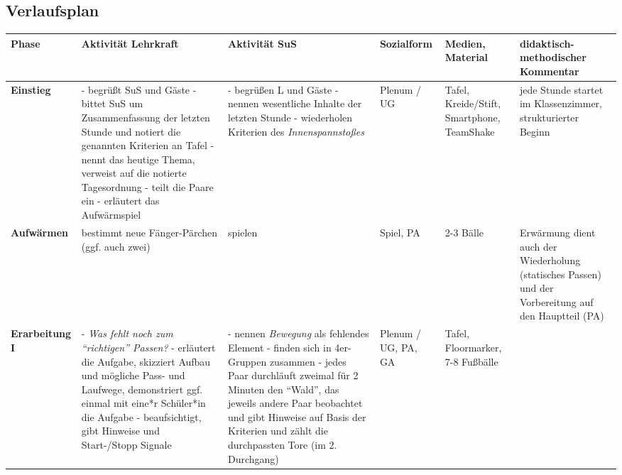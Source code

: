 

\begin{landscape}
\section{Verlaufsplan}

\singlespacing
\scriptsize
\begin{longtable}{p{2cm}|p{5.5cm}|p{5.5cm}|p{2cm}|p{2cm}|p{4cm}}

\textbf{Phase} &
\textbf{Aktivität Lehrkraft} &
\textbf{Aktivität SuS} &
\textbf{Sozialform} &
\textbf{Medien, Material} &
\textbf{didaktisch-methodischer Kommentar}
\\
\hline
\textbf{Einstieg}
&
- begrüßt SuS und Gäste \newline
- bittet SuS um Zusammenfassung der letzten Stunde und notiert die genannten Kriterien an Tafel \newline
- nennt das heutige Thema, verweist auf die notierte Tagesordnung \newline
- teilt die Paare ein \newline
- erläutert das Aufwärmspiel \newline
&
- begrüßen L und Gäste \newline
- nennen wesentliche Inhalte der letzten Stunde \newline
- wiederholen Kriterien des \emph{Innenspannstoßes}\newline
&
Plenum / UG
&
Tafel, Kreide/Stift, Smartphone, TeamShake
&
jede Stunde startet im Klassenzimmer, strukturierter Beginn

\\
\hline
\textbf{Aufwärmen}
&
bestimmt neue Fänger-Pärchen (ggf. auch zwei)
&
spielen
&
Spiel, PA
&
2-3 Bälle
&
Erwärmung dient auch der Wiederholung (statisches Passen) und der Vorbereitung auf den Hauptteil (PA)
\\
\hline

\textbf{Erarbeitung I}
&
- \emph{Was fehlt noch zum \enquote{richtigen} Passen?} \newline
- erläutert die Aufgabe, skizziert Aufbau und mögliche Pass- und Laufwege, demonstriert ggf. einmal mit eine*r Schüler*in die Aufgabe \newline
- beaufsichtigt, gibt Hinweise und Start-/Stopp Signale
&
- nennen \emph{Bewegung} als fehlendes Element \newline
- finden sich in 4er-Gruppen zusammen \newline
- jedes Paar durchläuft zweimal für 2 Minuten den \enquote{Wald}, das jeweils andere Paar beobachtet und gibt Hinweise auf Basis der Kriterien und zählt die durchpassten Tore (im 2. Durchgang)
&
Plenum / UG, PA, GA
&
Tafel, Floormarker, 7-8 Fußbälle
&


\end{longtable}
\end{landscape}
